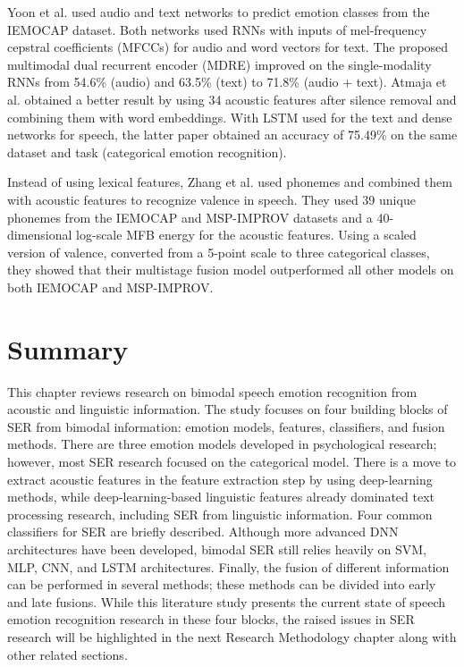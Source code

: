 Yoon et al. \cite{Yoon2018} used audio and text networks to predict emotion
classes from the IEMOCAP dataset. Both networks used RNNs with inputs of
mel-frequency cepstral coefficients (MFCCs) for audio and word vectors for
text. The proposed multimodal dual recurrent encoder (MDRE) improved on the
single-modality RNNs from 54.6\% (audio) and 63.5\% (text) to 71.8\% (audio +
text). Atmaja et al.  \cite{Atmaja2019b} obtained a better result by using 34
acoustic features after silence removal and combining them with word
embeddings. With  LSTM used for the text and dense networks for speech, the
latter paper obtained an accuracy of 75.49\% on the same dataset and task
(categorical emotion recognition).

Instead of using lexical features, Zhang et al. \cite{Zhang2019} used phonemes
and combined them with acoustic features to recognize valence in speech. They
used 39 unique phonemes from the IEMOCAP and MSP-IMPROV datasets and a
40-dimensional log-scale MFB energy for the acoustic features. Using a scaled
version of valence, converted from a 5-point scale to three categorical
classes, they showed that their multistage fusion model outperformed all other
models on both IEMOCAP and MSP-IMPROV.

\section{Summary}
This chapter reviews research on bimodal speech emotion recognition from
acoustic and linguistic information. The study focuses on four building blocks
of SER from bimodal information: emotion models, features, classifiers, and
fusion methods.  There are three emotion models developed in psychological
research; however, most SER research focused on the categorical model. There is
a move to extract acoustic features in the feature extraction step by using
deep-learning methods, while deep-learning-based linguistic features already
dominated text processing research, including SER from linguistic information.
Four common classifiers for SER are briefly described.  Although more advanced
DNN architectures have been developed, bimodal SER still relies heavily on SVM,
MLP, CNN, and LSTM architectures. Finally, the fusion of different information
can be performed in several methods; these methods can be divided into early
and late fusions. While this literature study presents the current state of
speech emotion recognition research in these four blocks, the raised issues in
SER research will be highlighted in the next Research Methodology chapter along
with other related sections. 
